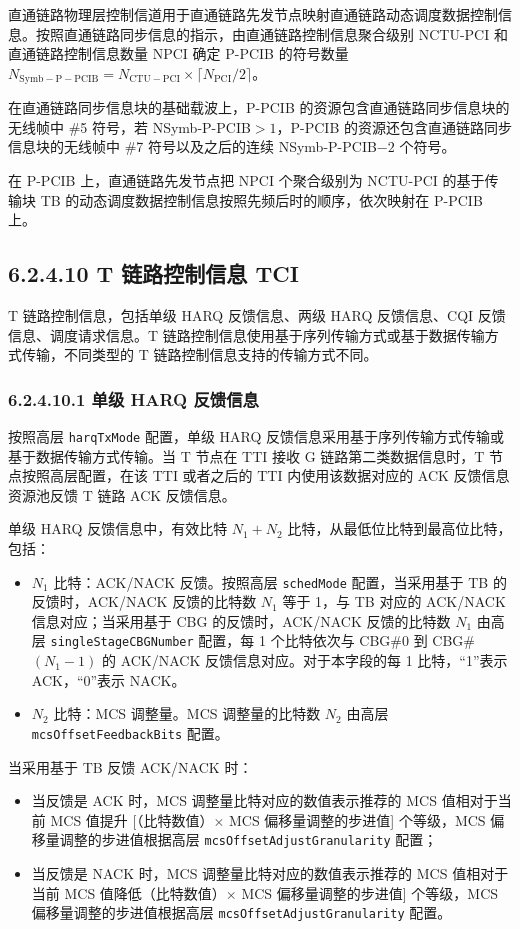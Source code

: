 \documentclass[11pt,a4paper]{ctexart}
\begin{document}
直通链路物理层控制信道用于直通链路先发节点映射直通链路动态调度数据控制信息。按照直通链路同步信息的指示，由直通链路控制信息聚合级别 NCTU-PCI 和直通链路控制信息数量 NPCI 确定 P-PCIB 的符号数量 $N_{\mathrm{Symb-P-PCIB}} = N_{\mathrm{CTU-PCI}} \times \lceil N_{\mathrm{PCI}}/2 \rceil$。

在直通链路同步信息块的基础载波上，P-PCIB 的资源包含直通链路同步信息块的无线帧中 \#5 符号，若 NSymb-P-PCIB$>1$，P-PCIB 的资源还包含直通链路同步信息块的无线帧中 \#7 符号以及之后的连续 NSymb-P-PCIB$-2$ 个符号。

在 P-PCIB 上，直通链路先发节点把 NPCI 个聚合级别为 NCTU-PCI 的基于传输块 TB 的动态调度数据控制信息按照先频后时的顺序，依次映射在 P-PCIB 上。

\subsection{6.2.4.10 T 链路控制信息 TCI}

T 链路控制信息，包括单级 HARQ 反馈信息、两级 HARQ 反馈信息、CQI 反馈信息、调度请求信息。T 链路控制信息使用基于序列传输方式或基于数据传输方式传输，不同类型的 T 链路控制信息支持的传输方式不同。

\subsubsection{6.2.4.10.1 单级 HARQ 反馈信息}

按照高层 \texttt{harqTxMode} 配置，单级 HARQ 反馈信息采用基于序列传输方式传输或基于数据传输方式传输。当 T 节点在 TTI 接收 G 链路第二类数据信息时，T 节点按照高层配置，在该 TTI 或者之后的 TTI 内使用该数据对应的 ACK 反馈信息资源池反馈 T 链路 ACK 反馈信息。

单级 HARQ 反馈信息中，有效比特 $N_1 + N_2$ 比特，从最低位比特到最高位比特，包括：
\begin{itemize}[nosep]
  \item $N_1$ 比特：ACK/NACK 反馈。按照高层 \texttt{schedMode} 配置，当采用基于 TB 的反馈时，ACK/NACK 反馈的比特数 $N_1$ 等于 1，与 TB 对应的 ACK/NACK 信息对应；当采用基于 CBG 的反馈时，ACK/NACK 反馈的比特数 $N_1$ 由高层 \texttt{singleStageCBGNumber} 配置，每 1 个比特依次与 CBG\#0 到 CBG\#$(N_1-1)$ 的 ACK/NACK 反馈信息对应。对于本字段的每 1 比特，``1''表示 ACK，``0''表示 NACK。
  \item $N_2$ 比特：MCS 调整量。MCS 调整量的比特数 $N_2$ 由高层 \texttt{mcsOffsetFeedbackBits} 配置。
\end{itemize}

当采用基于 TB 反馈 ACK/NACK 时：
\begin{itemize}[nosep]
  \item 当反馈是 ACK 时，MCS 调整量比特对应的数值表示推荐的 MCS 值相对于当前 MCS 值提升 [（比特数值）$\times$ MCS 偏移量调整的步进值] 个等级，MCS 偏移量调整的步进值根据高层 \texttt{mcsOffsetAdjustGranularity} 配置；
  \item 当反馈是 NACK 时，MCS 调整量比特对应的数值表示推荐的 MCS 值相对于当前 MCS 值降低（比特数值）$\times$ MCS 偏移量调整的步进值] 个等级，MCS 偏移量调整的步进值根据高层 \texttt{mcsOffsetAdjustGranularity} 配置。
\end{itemize}
\end{document}
